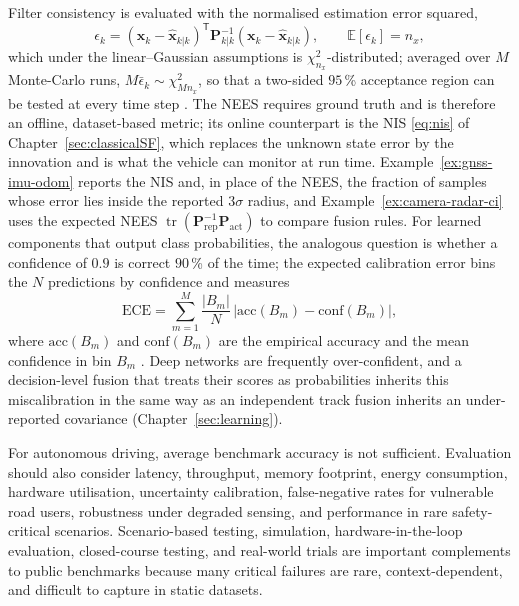 \documentclass[graybox,envcountchap]{style/SNmono}
\DeclareMathOperator{\tr}{tr}
\begin{document}
Filter consistency is evaluated with the normalised estimation error squared,
\begin{equation}
\epsilon_{k}=(\mathbf{x}_{k}-\widehat{\mathbf{x}}_{k|k})^{\mathsf T}\mathbf{P}_{k|k}^{-1}(\mathbf{x}_{k}-\widehat{\mathbf{x}}_{k|k}),
\qquad
\mathbb{E}[\epsilon_{k}]=n_{x},
\label{eq:nees}
\end{equation}
which under the linear--Gaussian assumptions is $\chi^{2}_{n_{x}}$-distributed; averaged over $M$ Monte-Carlo runs, $M\bar{\epsilon}_{k}\sim\chi^{2}_{Mn_{x}}$, so that a two-sided $95$\,\% acceptance region can be tested at every time step \cite{barshalom2001_estimation}. The NEES requires ground truth and is therefore an offline, dataset-based metric; its online counterpart is the NIS \eqref{eq:nis} of Chapter~\ref{sec:classicalSF}, which replaces the unknown state error by the innovation and is what the vehicle can monitor at run time. Example~\ref{ex:gnss-imu-odom} reports the NIS and, in place of the NEES, the fraction of samples whose error lies inside the reported $3\sigma$ radius, and Example~\ref{ex:camera-radar-ci} uses the expected NEES $\tr(\mathbf{P}_{\mathrm{rep}}^{-1}\mathbf{P}_{\mathrm{act}})$ to compare fusion rules. For learned components that output class probabilities, the analogous question is whether a confidence of $0.9$ is correct $90$\,\% of the time; the expected calibration error bins the $N$ predictions by confidence and measures
\begin{equation}
\mathrm{ECE}=\sum_{m=1}^{M}\frac{|B_{m}|}{N}\,\big|\mathrm{acc}(B_{m})-\mathrm{conf}(B_{m})\big|,
\label{eq:ece-metric}
\end{equation}
where $\mathrm{acc}(B_{m})$ and $\mathrm{conf}(B_{m})$ are the empirical accuracy and the mean confidence in bin $B_{m}$ \cite{guo2017_calibration}. Deep networks are frequently over-confident, and a decision-level fusion that treats their scores as probabilities inherits this miscalibration in the same way as an independent track fusion inherits an under-reported covariance (Chapter~\ref{sec:learning}).

For autonomous driving, average benchmark accuracy is not sufficient. Evaluation should also consider latency, throughput, memory footprint, energy consumption, hardware utilisation, uncertainty calibration, false-negative rates for vulnerable road users, robustness under degraded sensing, and performance in rare safety-critical scenarios. Scenario-based testing, simulation, hardware-in-the-loop evaluation, closed-course testing, and real-world trials are important complements to public benchmarks because many critical failures are rare, context-dependent, and difficult to capture in static datasets.
\end{document}

